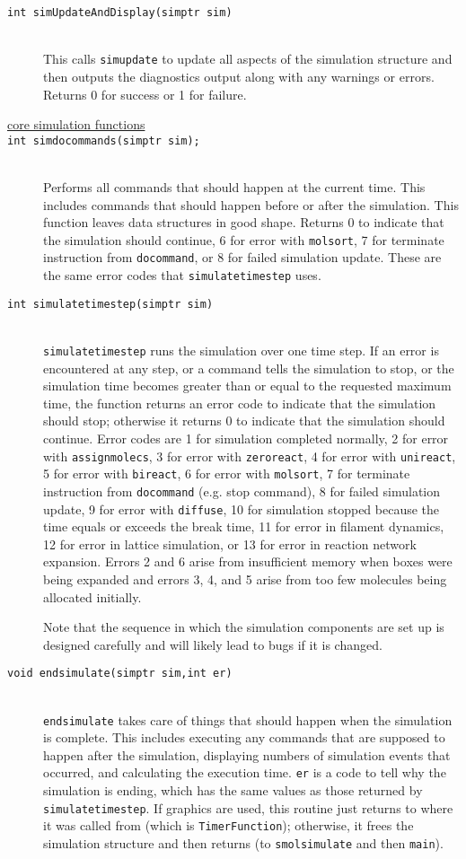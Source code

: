 \documentclass {scrbook}
\newcommand {\ttt} {\texttt}
\begin{document}
\begin{description}
\item[\ttt{int simUpdateAndDisplay(simptr sim)}]
\hfill \\
This calls \ttt{simupdate} to update all aspects of the simulation structure and then outputs the diagnostics output along with any warnings or errors. Returns 0 for success or 1 for failure.

\item[\underline{core simulation functions}]

\item[\ttt{int simdocommands(simptr sim);}]
\hfill \\
Performs all commands that should happen at the current time. This includes commands that should happen before or after the simulation. This function leaves data structures in good shape. Returns 0 to indicate that the simulation should continue, 6 for error with \ttt{molsort}, 7 for terminate instruction from \ttt{docommand}, or 8 for failed simulation update. These are the same error codes that \ttt{simulatetimestep} uses.

\item[\ttt{int simulatetimestep(simptr sim)}]
\hfill \\
\ttt{simulatetimestep} runs the simulation over one time step. If an error is encountered at any step, or a command tells the simulation to stop, or the simulation time becomes greater than or equal to the requested maximum time, the function returns an error code to indicate that the simulation should stop; otherwise it returns 0 to indicate that the simulation should continue. Error codes are 1 for simulation completed normally, 2 for error with \ttt{assignmolecs}, 3 for error with \ttt{zeroreact}, 4 for error with \ttt{unireact}, 5 for error with \ttt{bireact}, 6 for error with \ttt{molsort}, 7 for terminate instruction from \ttt{docommand} (e.g. stop command), 8 for failed simulation update, 9 for error with \ttt{diffuse}, 10 for simulation stopped because the time equals or exceeds the break time, 11 for error in filament dynamics, 12 for error in lattice simulation, or 13 for error in reaction network expansion. Errors 2 and 6 arise from insufficient memory when boxes were being expanded and errors 3, 4, and 5 arise from too few molecules being allocated initially.

Note that the sequence in which the simulation components are set up is designed carefully and will likely lead to bugs if it is changed.

\item[\ttt{void endsimulate(simptr sim,int er)}]
\hfill \\
\ttt{endsimulate} takes care of things that should happen when the simulation is complete. This includes executing any commands that are supposed to happen after the simulation, displaying numbers of simulation events that occurred, and calculating the execution time. \ttt{er} is a code to tell why the simulation is ending, which has the same values as those returned by \ttt{simulatetimestep}. If graphics are used, this routine just returns to where it was called from (which is \ttt{TimerFunction}); otherwise, it frees the simulation structure and then returns (to \ttt{smolsimulate} and then \ttt{main}).


\end{description}
\end{document}
